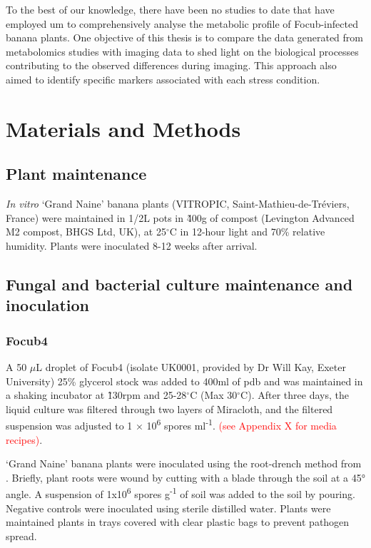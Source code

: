 To the best of our knowledge, there have been no studies to date that have employed \ac{um} to comprehensively analyse the metabolic profile of \ac{Focub}-infected banana plants. One objective of this thesis is to compare the data generated from metabolomics studies with imaging data to shed light on the biological processes contributing to the observed differences during imaging. This approach also aimed to identify specific markers associated with each stress condition. 

\newpage
\section{Materials and Methods}
\label{sec:Chapter4_MM}

\subsection{Plant maintenance}
\textit{In vitro} ‘Grand Naine’ banana plants (VITROPIC, Saint-Mathieu-de-Tréviers, France) were maintained in 1/2L pots in \~ 400g of compost (Levington Advanced M2 compost, BHGS Ltd, UK), at 25$^{\circ}$C in 12-hour light and 70\% relative humidity. Plants were inoculated 8-12 weeks after arrival. 

\subsection{Fungal and bacterial culture maintenance and inoculation}

\subsubsection{\acl{Focub4}}
A 50 \(\mu\)L droplet of \acl{Focub4} (isolate UK0001, provided by Dr Will Kay, Exeter University) 25\% glycerol stock  was added to 400ml of \acf{pdb} and was maintained in a shaking incubator at \~ 130rpm and 25-28$^{\circ}$C (Max 30$^{\circ}$C). After three days, the liquid culture was filtered through two layers of Miracloth, and the filtered suspension was adjusted to 1 × 10\textsuperscript{6} spores ml\textsuperscript{-1}. \textcolor{red}{(see Appendix X for media recipes)}.

‘Grand Naine’ banana plants were inoculated using the root-drench method from \textcite{Garcia-Bastidas2019}. Briefly, plant roots were wound by cutting with a blade through the soil at a 45° angle. A suspension of 1x10\textsuperscript{6} spores g\textsuperscript{-1} of soil was added to the soil by pouring. Negative controls were inoculated using sterile distilled water. Plants were maintained plants in trays covered with clear plastic bags to prevent pathogen spread. 

